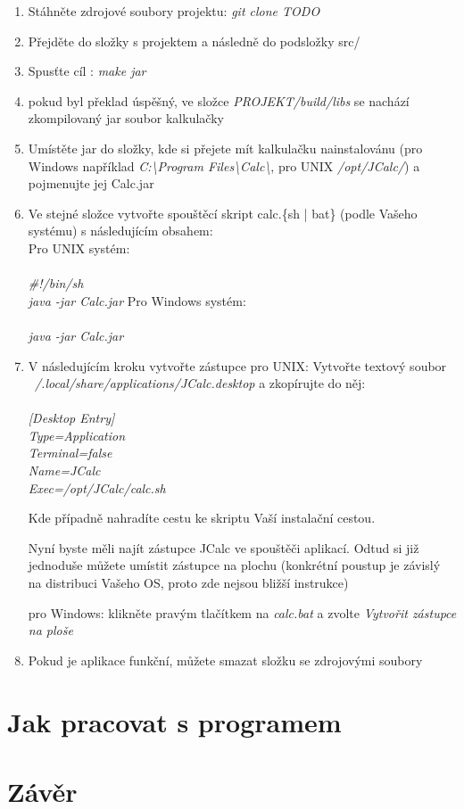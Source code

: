 \documentclass[a4paper, 11pt]{article}
\begin{document}
\begin{enumerate}
	\item Stáhněte zdrojové soubory projektu: \emph{git clone TODO}
	\item Přejděte do složky s projektem a následně do podsložky src/
	\item Spusťte cíl : \emph{make jar}
	\item pokud byl překlad úspěšný, ve složce \emph{PROJEKT/build/libs} se nachází zkompilovaný jar soubor kalkulačky
	\item Umístěte jar do složky, kde si přejete mít kalkulačku nainstalovánu (pro Windows například \emph{C:\textbackslash Program Files\textbackslash Calc\textbackslash}, pro UNIX \emph{/opt/JCalc/}) a pojmenujte jej Calc.jar
	\item Ve stejné složce vytvořte spouštěcí skript calc.\{sh | bat\} (podle Vašeho systému) s následujícím obsahem:\\
		\subitem Pro UNIX systém:\\\\
			\emph{\#!/bin/sh\\
				java -jar Calc.jar}
		\subitem Pro Windows systém:\\\\
			\emph{java -jar Calc.jar}
			
	\item V následujícím kroku vytvořte zástupce
		\subitem pro UNIX:
			\subsubitem Vytvořte textový soubor \emph{~/.local/share/applications/JCalc.desktop} a zkopírujte do něj:\\\\
						\emph{
						[Desktop Entry]\\
						Type=Application\\
						Terminal=false\\
						Name=JCalc\\
						Exec=/opt/JCalc/calc.sh\\
						}

			\subsubitem Kde případně nahradíte cestu ke skriptu Vaší instalační cestou.
			
			\subsubitem Nyní byste měli najít zástupce JCalc ve spouštěči aplikací. Odtud si již jednoduše můžete umístit zástupce na plochu (konkrétní poustup je závislý na distribuci Vašeho OS, proto zde nejsou bližší instrukce)
		
		\subitem pro Windows:
			\subsubitem klikněte pravým tlačítkem na \emph{calc.bat} a zvolte \emph{Vytvořit zástupce na ploše}
			
			
	\item Pokud je aplikace funkční, můžete smazat složku se zdrojovými soubory
\end{enumerate}

\section{Jak pracovat s programem}

\section{Závěr}
\end{document}

